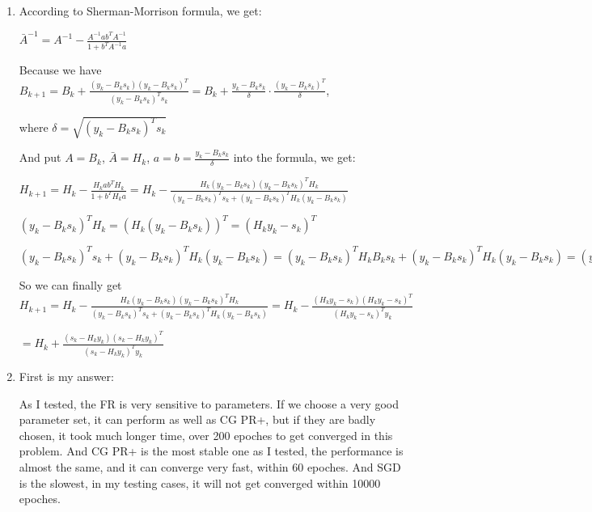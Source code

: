 \documentclass[12pt]{article}
\begin{document}
\begin{enumerate}
So we can get $\beta = \frac{\bigtriangledown f_{k+1}^T \bigtriangledown f_{k+1}}{ \bigtriangledown f_k^T \bigtriangledown f_k }$





\item

According to Sherman-Morrison formula, we get:

$\bar A^{-1} = A^{-1} - \frac{A^{-1} ab^TA^{-1}}{1 + b^TA^{-1}a}$

Because we have $B_{k+1} = B_k + \frac{(y_k - B_k s_k)(y_k - B_k s_k)^T}{(y_k - B_k s_k)^T s_k} = B_k + \frac{y_k - B_ks_k}{\delta} \cdot \frac{(y_k - B_ks_k)^T}{\delta} $,

where $\delta = \sqrt{(y_k - B_k s_k)^T s_k}$

And put $A = B_k$, $\bar A = H_k$, $a=b=\frac{y_k - B_ks_k}{\delta}$ into the formula, we get:

$H_{k+1} = H_k - \frac{H_k ab^TH_k}{1 + b^TH_ka} = H_k - \frac{H_k (y_k - B_ks_k) (y_k - B_ks_k)^T H_k }{ (y_k - B_k s_k)^T s_k + (y_k - B_ks_k)^T H_k (y_k - B_ks_k) }$

$(y_k-B_ks_k)^TH_k = (H_k (y_k - B_k s_k))^T = (H_k y_k - s_k)^T$

$(y_k - B_k s_k)^T s_k + (y_k - B_ks_k)^T H_k (y_k - B_ks_k) = (y_k - B_k s_k)^T H_k B_ks_k + (y_k - B_ks_k)^T H_k (y_k - B_ks_k) = (y_k - B_k s_k)^T H_k (B_ks_k + y_k - B_k s_k) = (y_k - B_k s_k)^T H_k y_k = ( H_k y_k - s_k)^T y_k$

So we can finally get $H_{k+1} = H_k - \frac{H_k (y_k - B_ks_k) (y_k - B_ks_k)^T H_k }{ (y_k - B_k s_k)^T s_k + (y_k - B_ks_k)^T H_k (y_k - B_ks_k)} = H_k - \frac{(H_k y_k - s_k)(H_k y_k - s_k)^T}{(H_k y_k - s_k)^Ty_k}$

$ = H_k + \frac{(s_k - H_k y_k)(s_k - H_k y_k)^T}{(s_k - H_k y_k)^Ty_k}$


\bigskip









\item

First is my answer:

As I tested, the FR is very sensitive to parameters. If we choose a very good parameter set, it can perform as well as CG PR+, but if they are badly chosen, it took much longer time, over 200 epoches to get converged in this problem. And CG PR+ is the most stable one as I tested, the performance is almost the same, and it can converge very fast, within 60 epoches. And SGD is the slowest, in my testing cases, it will not get converged within 10000 epoches.


\end{enumerate}
\end{document}
